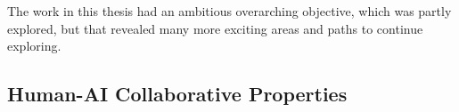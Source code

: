 
The work in this thesis had an ambitious overarching objective, which was partly explored, but that revealed many more exciting areas and paths to continue exploring.




\subsection{Human-AI Collaborative Properties}


